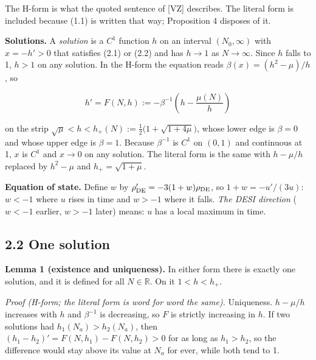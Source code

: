 \documentclass[11pt,a4paper]{article}
\begin{document}
The H-form is what the quoted sentence of [VZ] describes. The literal form is included because (1.1) is written that
way; Proposition 4 disposes of it.

{\bfseries\boldmath Solutions.} A \emph{solution} is a $C^1$ function $h$ on an interval $(N_0, \infty)$ with $x = -h' > 0$ that satisfies
(2.1) or (2.2) and has $h \to 1$ as $N \to \infty$. Since $h$ falls to 1, $h > 1$ on any solution. In the H-form the
equation reads $\beta(x) = (h^2 - \mu)/h$, so


\begin{equation*}
h' = F(N, h) := -\beta^{-1}\!\left(h - \frac{\mu(N)}{h}\right) \tag{2.3}
\end{equation*}


on the strip $\sqrt{\mu} < h < h_+(N) := \tfrac12\big(1 + \sqrt{1 + 4\mu}\big)$, whose lower edge is $\beta = 0$ and whose
upper edge is $\beta = 1$. Because $\beta^{-1}$ is $C^1$ on $(0,1)$ and continuous at 1, $x$ is $C^1$ and $x \to 0$ on
any solution. The literal form is the same with $h - \mu/h$ replaced by $h^2 - \mu$ and $h_+ = \sqrt{1 + \mu}$.

{\bfseries\boldmath Equation of state.} Define $w$ by $\rho_{\rm DE}' = -3(1 + w)\rho_{\rm DE}$, so $1 + w = -u'/(3u)$: $w < -1$ where $u$
rises in time and $w > -1$ where it falls. \emph{The DESI direction} ($w < -1$ earlier, $w > -1$ later) means: $u$ has a
local maximum in time.


\subsection*{2.2 One solution}
{\bfseries\boldmath Lemma 1 (existence and uniqueness).} In either form there is exactly one solution, and it is defined for all
$N \in \mathbb{R}$. On it $1 < h < h_+$.

\emph{Proof (H-form; the literal form is word for word the same).} Uniqueness. $h - \mu/h$ increases with $h$ and
$\beta^{-1}$ is decreasing, so $F$ is strictly increasing in $h$. If two solutions had $h_1(N_a) > h_2(N_a)$, then
$(h_1 - h_2)' = F(N, h_1) - F(N, h_2) > 0$ for as long as $h_1 > h_2$, so the difference would stay above its value at
$N_a$ for ever, while both tend to 1.
\end{document}
